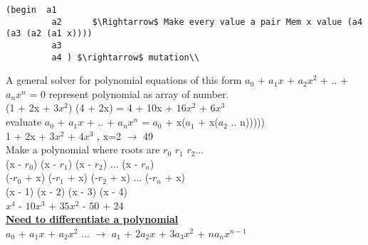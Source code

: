 \documentclass{article}
\begin{document}
\begin{flushleft}
\begin{flushleft}
\begin{flushleft}
\begin{flushleft}
\begin{flushleft}
\begin{lstlisting}[mathescape]
 (begin  a1
         a2      $\Rightarrow$ Make every value a pair Mem x value (a4 (a3 (a2 (a1 x))))
         a3
         a4 ) $\rightarrow$ mutation\\
\end{lstlisting}
\vspace*{0.7cm}
 \begin{flushleft}
A general solver for polynomial equations of this form $a_{0}$ + $a_{1}x$ + $a_{2}x^{2}$ + .. + $a_{n}x^{n}$ = 0 represent polynomial as array of number.\\
\vspace*{0.3cm}
\hspace*{1.5cm}(1 + 2x + $3x^{2}$) (4 + 2x) = 4 + 10x + $16x^{2}$ + $6x^{3}$\\
\vspace*{0.3cm}
evaluate $a_{0}$ + $a_{1}x$ + .. + $a_{n}x^{n}$ = $a_{0}$ + x($a_{1}$ + x($a_{2}$ .. n)))))\\
\vspace*{0.3cm}
\hspace*{1.5cm} 1 + 2x + $3x^{2}$ + $4x^{3}$ , x=2 $\rightarrow$ 49\\
Make a polynomial where roots are $r_{0}$ $r_{1}$ $r_{2} ...$\\
\vspace*{0.4cm}
\hspace*{0.5cm} (x - $r_{0}$) (x - $r_{1}$) (x - $r_{2}$) ... (x - $r_{n}$)\\
\vspace*{0.2cm}
\hspace*{0.5cm} (-$r_{0}$ + x) (-$r_{1}$ + x) (-$r_{2}$ + x) ... (-$r_{n}$ + x)\\
\vspace*{0.6cm}
\hspace*{0.5cm} (x - 1) (x - 2) (x - 3) (x - 4)\\
\vspace*{0.2cm}
\hspace*{0.5cm} $x^{4}$ - $10x^{3}$ + $35x^{2}$ - 50  + 24\\
\vspace*{1cm}
\underline{\textbf{Need to differentiate a polynomial}}\\
\vspace*{0.4cm}
\hspace*{0.3cm} $a_{0}$ + $a_{1}x$ + $a_{2}x^2$ ... $\rightarrow$  $a_{1}$ + $2a_{2}x$ + $3a_{3}x^2$ + $na_{n}x^{n-1}$
  
\end{flushleft}
\end{flushleft}
\end{flushleft}
\end{flushleft}
\end{flushleft}
\end{flushleft}
\end{document}
